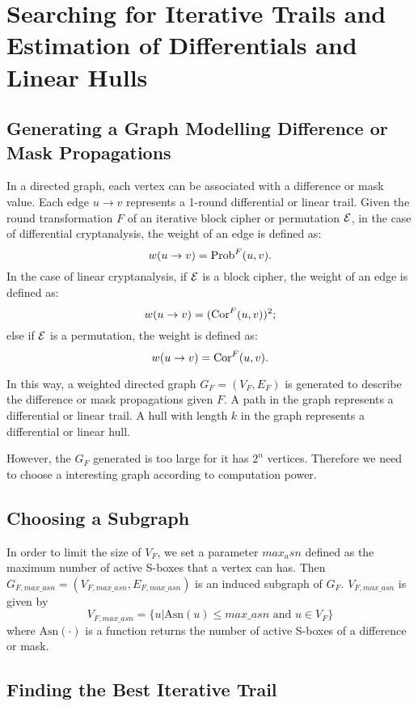 \section{Searching for Iterative Trails and Estimation of Differentials and Linear Hulls\label{sec:method}}

\subsection{Generating a Graph Modelling Difference or Mask Propagations}

In a directed graph, each vertex can be associated with a difference or mask value. Each edge $u\rightarrow v$ represents a 1-round differential or linear trail. Given the round transformation $F$ of an iterative block cipher or permutation $\mathcal{E}$, in the case of differential cryptanalysis, the weight of an edge is defined as:
\[
    w(u\rightarrow v)=\text{Prob}^{F}(u,v).
\]
In the case of linear cryptanalysis, if $\mathcal{E}$ is a block cipher, the weight of an edge is defined as:
\[
    w(u\rightarrow v)=(\text{Cor}^{F}(u,v))^2;
\]
else if $\mathcal{E}$ is a permutation, the weight is defined as:
\[
    w(u\rightarrow v)=\text{Cor}^{F}(u,v).
\]

In this way, a weighted directed graph $G_{F}=(V_{F},E_{F})$ is generated to describe the difference or mask propagations given $F$. A path in the graph represents a differential or linear trail. A hull with length $k$ in the graph represents a differential or linear hull. 

However, the $G_F$ generated is too large for it has $2^n$ vertices. Therefore we need to choose a interesting graph according to computation power. 

\subsection{Choosing a Subgraph}

In order to limit the size of $V_F$, we set a parameter $max_asn$ defined as the maximum number of active S-boxes that a vertex can has. Then $G_{F,max\_asn}=(V_{F,max\_asn},E_{F,max\_asn})$ is an induced subgraph of $G_F$. $V_{F,max\_asn}$ is given by
\[
    V_{F,max\_asn}=\{u|\text{Asn}(u)\leq max\_asn \text{ and } u\in V_F\}
\]
where $\text{Asn}(\cdot)$ is a function returns the number of active S-boxes of a difference or mask.

\subsection{Finding the Best Iterative Trail}

